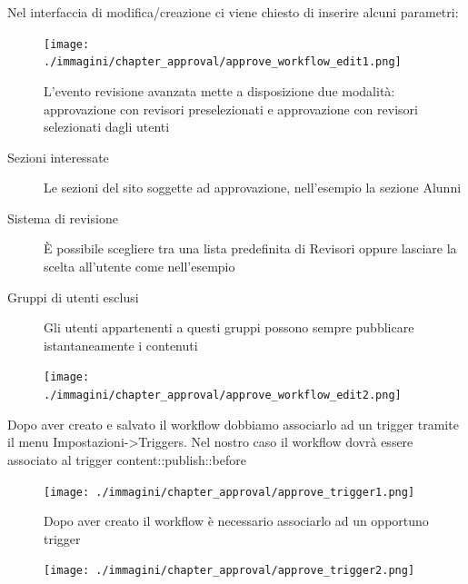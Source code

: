 Nel interfaccia di modifica/creazione ci viene chiesto di inserire alcuni parametri:
\begin{figure}[H]
 \centering
 \texttt{[image: ./immagini/chapter\_approval/approve\_workflow\_edit1.png]}
 \caption{L'evento revisione avanzata mette a disposizione due modalità: approvazione con revisori preselezionati e approvazione con revisori selezionati dagli utenti}
 \label{fig:approve_edit1}
\end{figure}

\begin{description}
 \item[Sezioni interessate] Le sezioni del sito soggette ad approvazione, nell'esempio la sezione Alunni
\item[Sistema di revisione]È possibile scegliere tra una lista predefinita di Revisori oppure lasciare la scelta all'utente come nell'esempio
\item[Gruppi di utenti esclusi]Gli utenti appartenenti a questi gruppi possono sempre pubblicare istantaneamente i contenuti
\end{description}



\begin{figure}[H]
 \centering
 \texttt{[image: ./immagini/chapter\_approval/approve\_workflow\_edit2.png]}
 \label{fig:approve_edit2}
\end{figure}

Dopo aver creato e salvato il workflow dobbiamo associarlo ad un trigger tramite il menu Impostazioni->Triggers. Nel nostro caso il workflow dovrà essere associato al trigger content::publish::before
\begin{figure}[H]
 \centering
 \texttt{[image: ./immagini/chapter\_approval/approve\_trigger1.png]}
 \caption{Dopo aver creato il workflow è necessario associarlo ad un opportuno trigger}
 \label{fig:approve_trigger1}
\end{figure}
\begin{figure}[H]
 \centering
 \texttt{[image: ./immagini/chapter\_approval/approve\_trigger2.png]}
 \label{fig:approver_trigger2}
\end{figure}









